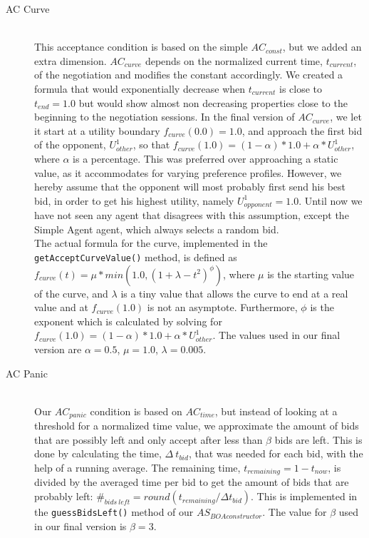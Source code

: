 \begin{description}
  \item[AC Curve] \hfill \\
This acceptance condition is based on the simple $AC_{const}$\cite{baarslag2013acceptance}, but we added an extra dimension. $AC_{curve}$ depends on the normalized current time, $t_{current}$, of the negotiation and modifies the constant accordingly. We created a formula that would exponentially decrease when $t_{current}$ is close to $t_{end} = 1.0$ but would show almost non decreasing properties close to the beginning to the negotiation sessions. In the final version of $AC_{curve}$, we let it start at a utility boundary $f_{curve}(0.0) = 1.0$, and approach the first bid of the opponent, $U_{other}^{1}$, so that $f_{curve}(1.0) = (1 - \alpha) * 1.0 + \alpha * U_{other}^{1}$, where $\alpha$ is a percentage. This was preferred over approaching a static value, as it accommodates for varying preference profiles. However, we hereby assume that the opponent will most probably first send his best bid, in order to get his highest utility, namely $U_{opponent}^{1} = 1.0$. Until now we have not seen any agent that disagrees with this assumption, except the Simple Agent agent, which always selects a random bid. \\

The actual formula for the curve, implemented in the \texttt{getAcceptCurveValue()} method, is defined as $f_{curve}(t) = \mu * min(1.0, (1 + \lambda - t^2)^{\phi})$, where $\mu$ is the starting value of the curve, and $\lambda$ is a tiny value that allows the curve to end at a real value and at $f_{curve}(1.0)$ is not an asymptote. Furthermore, $\phi$ is the exponent which is calculated by solving for $f_{curve}(1.0) = (1 - \alpha) * 1.0 + \alpha * U_{other}^{1}$. The values used in our final version are $\alpha = 0.5$, $\mu = 1.0$, $\lambda = 0.005$.

  \item[AC Panic] \hfill \\
Our $AC_{panic}$ condition is based on $AC_{time}$\cite{baarslag2013acceptance}, but instead of looking at a threshold for a normalized time value, we approximate the amount of bids that are possibly left and only accept after less than $\beta$ bids are left. This is done by calculating the time, $\Delta~t_{bid}$, that was needed for each bid, with the help of a running average. The remaining time, $t_{remaining} = 1 - t_{now}$, is divided by the averaged time per bid to get the amount of bids that are probably left: $\#_{bids~left} = round(t_{remaining} / \Delta t_{bid})$. This is implemented in the \texttt{guessBidsLeft()} method of our $AS_{BOAconstructor}$. The value for $\beta$ used in our final version is $\beta = 3$.\\


\end{description}

